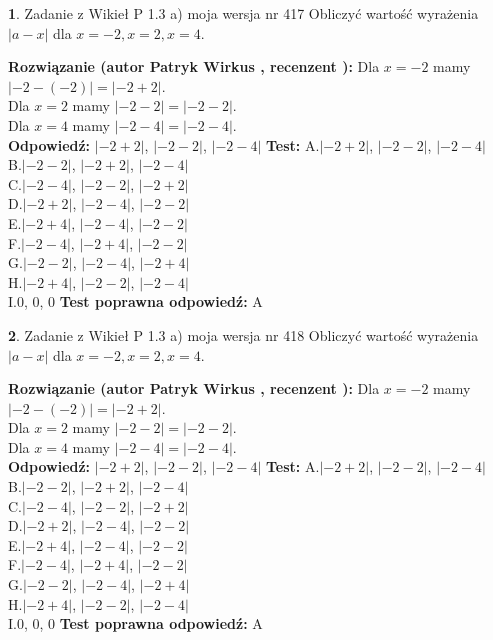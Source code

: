 \documentclass[12pt, a4paper]{article}
\theoremstyle{definition} %
\newtheorem{zad}{}
\newcommand{\zadStart}[1]{\begin{zad}#1\newline}
\newcommand{\zadStop}{\end{zad}}
\newcommand{\rozwStart}[2]{\noindent \textbf{Rozwiązanie (autor #1 , recenzent #2): }\newline}
\newcommand{\rozwStop}{\newline}
\newcommand{\odpStart}{\noindent \textbf{Odpowiedź:}\newline}
\newcommand{\odpStop}{\newline}
\newcommand{\testStart}{\noindent \textbf{Test:}\newline}
\newcommand{\testStop}{\newline}
\newcommand{\kluczStart}{\noindent \textbf{Test poprawna odpowiedź:}\newline}
\newcommand{\kluczStop}{\newline}
\begin{document}
\zadStart{Zadanie z Wikieł P 1.3 a) moja wersja nr 417}
Obliczyć wartość wyrażenia $|a - x|$ dla $x=-2,x=2,x=4$.
\zadStop
\rozwStart{Patryk Wirkus}{}
Dla $x = -2$ mamy $|-2 - (-2)| = |-2 + 2|$.\\
Dla $x = 2$ mamy $|-2 - 2| = |-2 - 2|$.\\
Dla $x = 4$ mamy $|-2 - 4| = |-2 - 4|$.\\
\rozwStop
\odpStart
$|-2 + 2|$, $|-2 - 2|$, $|-2 - 4|$
\odpStop
\testStart
A.$|-2 + 2|$, $|-2 - 2|$, $|-2 - 4|$\\
B.$|-2 - 2|$, $|-2 + 2|$, $|-2 - 4|$\\
C.$|-2 - 4|$, $|-2 - 2|$, $|-2 + 2|$\\
D.$|-2 + 2|$, $|-2 - 4|$, $|-2 - 2|$\\
E.$|-2 + 4|$, $|-2 - 4|$, $|-2 - 2|$\\
F.$|-2 - 4|$, $|-2 + 4|$, $|-2 - 2|$\\
G.$|-2 - 2|$, $|-2 - 4|$, $|-2 + 4|$\\
H.$|-2 + 4|$, $|-2 - 2|$, $|-2 - 4|$\\
I.$0$, $0$, $0$
\testStop
\kluczStart
A
\kluczStop



\zadStart{Zadanie z Wikieł P 1.3 a) moja wersja nr 418}
Obliczyć wartość wyrażenia $|a - x|$ dla $x=-2,x=2,x=4$.
\zadStop
\rozwStart{Patryk Wirkus}{}
Dla $x = -2$ mamy $|-2 - (-2)| = |-2 + 2|$.\\
Dla $x = 2$ mamy $|-2 - 2| = |-2 - 2|$.\\
Dla $x = 4$ mamy $|-2 - 4| = |-2 - 4|$.\\
\rozwStop
\odpStart
$|-2 + 2|$, $|-2 - 2|$, $|-2 - 4|$
\odpStop
\testStart
A.$|-2 + 2|$, $|-2 - 2|$, $|-2 - 4|$\\
B.$|-2 - 2|$, $|-2 + 2|$, $|-2 - 4|$\\
C.$|-2 - 4|$, $|-2 - 2|$, $|-2 + 2|$\\
D.$|-2 + 2|$, $|-2 - 4|$, $|-2 - 2|$\\
E.$|-2 + 4|$, $|-2 - 4|$, $|-2 - 2|$\\
F.$|-2 - 4|$, $|-2 + 4|$, $|-2 - 2|$\\
G.$|-2 - 2|$, $|-2 - 4|$, $|-2 + 4|$\\
H.$|-2 + 4|$, $|-2 - 2|$, $|-2 - 4|$\\
I.$0$, $0$, $0$
\testStop
\kluczStart
A
\kluczStop
\end{document}
